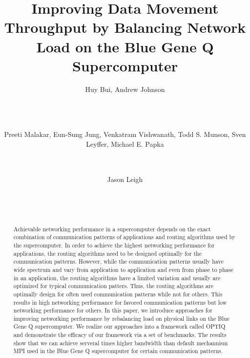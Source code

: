 \documentclass{acm_proc_article-sp}
\begin{document}
\title{Improving Data Movement Throughput by Balancing Network Load on the Blue Gene Q Supercomputer}

\author{
\alignauthor Huy Bui, Andrew Johnson\\
       \\
       \\
       \\
\and  %
\alignauthor Preeti Malakar, Eun-Sung Jung, Venkatram Vishwanath, Todd S. Munson, Sven Leyffer, Michael E. Papka\\
       \\
       \\
\and
\alignauthor Jason Leigh\\
       \\
       \\
       \\
}

\maketitle
\begin{abstract}
Achievable networking performance in a supercomputer depends on the exact combination of communication patterns of applications and routing algorithms used by the supercomputer. In order to achieve the highest networking performance for applications, the routing algorithms need to be designed optimally for the communication patterns. However, while the communication patterns usually have wide spectrum and vary from application to application and even from phase to phase in an application, the routing algorithms have a limited variation and usually are optimized for typical communication patters. Thus, the routing algorithms are optimally design for often used communication patterns while not for others. This results in high networking performance for favored communication patterns but low networking performance for others. In this paper, we introduce approaches for improving networking performance by rebalancing load on physical links on the Blue Gene Q supercomputer. We realize our approaches into a framework called OPTIQ and demonstrate the efficacy of our framework via a set of benchmarks. The results show that we can achieve serveral times higher bandwidth than default mechannism MPI used in the Blue Gene Q supercomputer for certain communication patterns.
\end{abstract}
\end{document}
